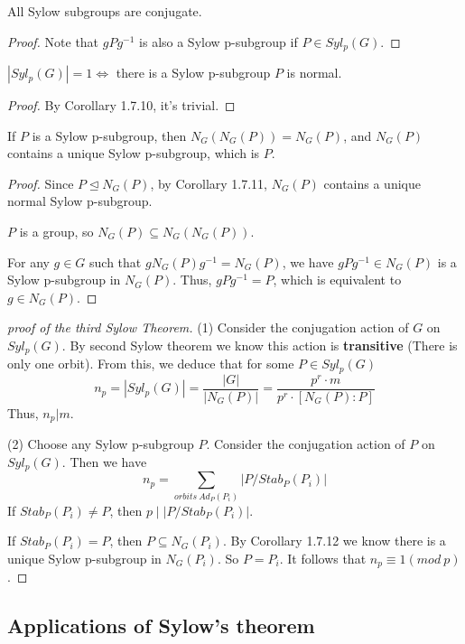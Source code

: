 \documentclass[11pt,fleqn]{book} %
\begin{document}
\begin{CJK}{UTF8}{gkai}
\begin{corollary}
	All Sylow subgroups are conjugate.
\end{corollary}
\begin{proof}
	Note that $gPg^{-1}$ is also a Sylow p-subgroup if $P \in Syl_p(G)$.
\end{proof}

\begin{corollary}
	$|Syl_p(G)| = 1 \iff $ there is a Sylow p-subgroup $P$ is normal.
\end{corollary}
\begin{proof}
	By Corollary 1.7.10, it's trivial.
\end{proof}

\begin{corollary}
	If $P$ is a Sylow p-subgroup, then $N_G(N_G(P)) = N_G(P)$, and $N_G(P)$ contains a unique Sylow p-subgroup, which is $P$.
\end{corollary}
\begin{proof}
	Since $P \unlhd N_G(P)$, by Corollary 1.7.11, $N_G(P)$ contains a unique normal Sylow p-subgroup. 

	$P$ is a group, so $N_G(P) \subseteq N_G(N_G(P))$. 
	
	For any $g\in G$ such that $gN_G(P)g^{-1} = N_G(P)$, we have $gPg^{-1} \in N_G(P)$ is a Sylow p-subgroup in $N_G(P)$. Thus, $gPg^{-1} = P$,
	which is equivalent to $g \in N_G(P)$.
\end{proof}

\begin{proof}
	[proof of the third Sylow Theorem] 
	(1) Consider the conjugation action of $G$ on $Syl_p(G)$. By second Sylow theorem we know this action is {\bf transitive} (There is only one orbit). From this, we deduce that for some $P \in Syl_p(G)$
	\[n_p = |Syl_p(G)| = \frac {|G|} {|N_G(P)|}= \frac {p^r \cdot m} {p^r \cdot [N_G(P) : P]}\] 
	Thus, $n_p | m$.

	(2) Choose any Sylow p-subgroup $P$. Consider the conjugation action of $P$ on $Syl_p(G)$. Then we have 
	\[n_p = \sum_{orbits \ Ad_P(P_i)} |P/Stab_P(P_i)|\]
	If $Stab_P(P_i) \neq P$, then $ p \mid |P/Stab_P(P_i)|$. 

	If $Stab_P(P_i) = P$, then $P \subseteq N_G(P_i)$. By Corollary 1.7.12 we know there is a unique Sylow p-subgroup in $N_G(P_i)$. So $P = P_i$.
	It follows that $n_p \equiv 1 (mod \ p)$.
\end{proof}

\subsection{Applications of Sylow's theorem}


\end{CJK}
\end{document}
